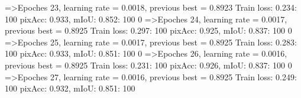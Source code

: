 =>Epoches 23, learning rate = 0.0018,                 previous best = 0.8923
Train loss: 0.234: 100%
pixAcc: 0.933, mIoU: 0.852: 100%
  0%
=>Epoches 24, learning rate = 0.0017,                 previous best = 0.8925
Train loss: 0.297: 100%
pixAcc: 0.925, mIoU: 0.837: 100%
  0%
=>Epoches 25, learning rate = 0.0017,                 previous best = 0.8925
Train loss: 0.283: 100%
pixAcc: 0.933, mIoU: 0.851: 100%
  0%
=>Epoches 26, learning rate = 0.0016,                 previous best = 0.8925
Train loss: 0.231: 100%
pixAcc: 0.926, mIoU: 0.837: 100%
  0%
=>Epoches 27, learning rate = 0.0016,                 previous best = 0.8925
Train loss: 0.249: 100%
pixAcc: 0.932, mIoU: 0.851: 100%
